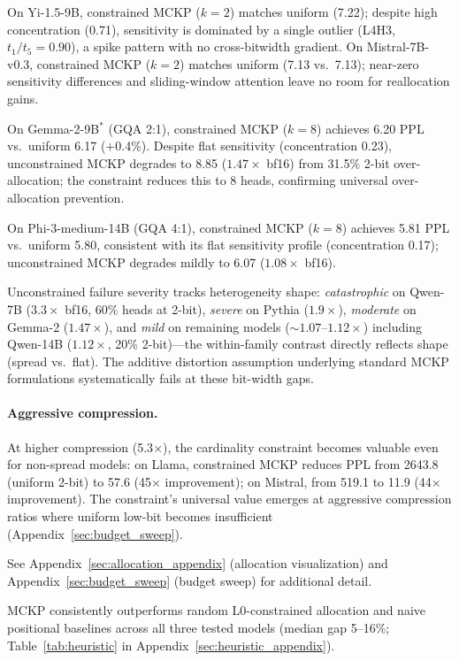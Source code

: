 On Yi-1.5-9B, constrained MCKP ($k{=}2$) matches uniform (7.22); despite high concentration (0.71), sensitivity is dominated by a single outlier (L4H3, $t_1/t_5{=}0.90$), a spike pattern with no cross-bitwidth gradient.
On Mistral-7B-v0.3, constrained MCKP ($k{=}2$) matches uniform (7.13 vs.\ 7.13); near-zero sensitivity differences and sliding-window attention leave no room for reallocation gains.

On Gemma-2-9B$^*$ (GQA 2:1), constrained MCKP ($k{=}8$) achieves 6.20 PPL vs.\ uniform 6.17 ($+$0.4\%).
Despite flat sensitivity (concentration 0.23), unconstrained MCKP degrades to 8.85 ($1.47\times$ bf16) from 31.5\% 2-bit over-allocation; the constraint reduces this to 8 heads, confirming universal over-allocation prevention.

On Phi-3-medium-14B (GQA 4:1), constrained MCKP ($k{=}8$) achieves 5.81 PPL vs.\ uniform 5.80, consistent with its flat sensitivity profile (concentration 0.17); unconstrained MCKP degrades mildly to 6.07 ($1.08\times$ bf16). %

Unconstrained failure severity tracks heterogeneity shape: \emph{catastrophic} on Qwen-7B ($3.3\times$ bf16, 60\% heads at 2-bit), \emph{severe} on Pythia ($1.9\times$), \emph{moderate} on Gemma-2 ($1.47\times$), and \emph{mild} on remaining models (${\sim}1.07$--$1.12\times$) including Qwen-14B ($1.12\times$, 20\% 2-bit)---the within-family contrast directly reflects shape (spread vs.\ flat).
The additive distortion assumption underlying standard MCKP formulations systematically fails at these bit-width gaps.

\paragraph{Aggressive compression.}
At higher compression (5.3$\times$), the cardinality constraint becomes valuable even for non-spread models: on Llama, constrained MCKP reduces PPL from 2643.8 (uniform 2-bit) to 57.6 (45$\times$ improvement); on Mistral, from 519.1 to 11.9 (44$\times$ improvement). The constraint's universal value emerges at aggressive compression ratios where uniform low-bit becomes insufficient (Appendix~\ref{sec:budget_sweep}).

See Appendix~\ref{sec:allocation_appendix} (allocation visualization) and Appendix~\ref{sec:budget_sweep} (budget sweep) for additional detail.

MCKP consistently outperforms random L0-constrained allocation and naive positional baselines across all three tested models (median gap 5--16\%; Table~\ref{tab:heuristic} in Appendix~\ref{sec:heuristic_appendix}).

